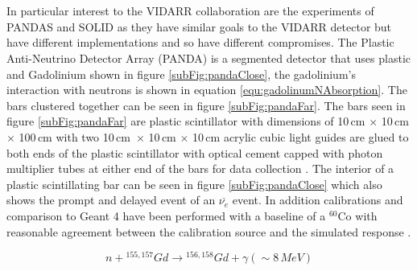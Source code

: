 \\\\In particular interest to the VIDARR collaboration are the experiments of PANDAS and SOLID as they have similar goals to the VIDARR detector but have different implementations and so have different compromises. The Plastic Anti-Neutrino Detector Array (PANDA) is a segmented detector that uses plastic and Gadolinium shown in figure \ref{subFig:pandaClose}, the gadolinium's interaction with neutrons is shown in equation \ref{equ:gadolinumNAbsorption}. The bars clustered together can be seen in figure \ref{subFig:pandaFar}. The bars seen in figure \ref{subFig:pandaFar} are plastic scintillator with dimensions of 10\,cm $\times$ 10\,cm $\times$ 100\,cm with two 10\,cm\ $\times$ 10\,cm $\times$ 10\,cm acrylic cubic light guides are glued to both ends of the plastic scintillator with optical cement capped with photon multiplier tubes at either end of the bars for data collection \cite{PANDA_2014}. The interior of a plastic scintillating bar can be seen in figure \ref{subFig:pandaClose} which also shows the prompt and delayed event of an $\overline{\nu_e}$ event. In addition calibrations and comparison to Geant 4 \cite{Agostinelli:2002hh} have been performed with a baseline of a $^{60}$Co with reasonable agreement between the calibration source and the simulated response \cite{PANDA_2012}. 

\begin{equation}
n + {^{155,157}Gd} \rightarrow {^{156,158} Gd} + \gamma (\sim 8\,MeV)
\label{equ:gadolinumNAbsorption}
\end{equation}

